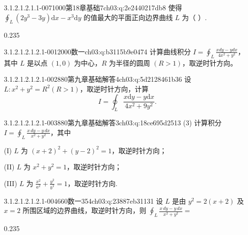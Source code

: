 \begin{q}{3.1.2.1.2.1.1-007}{1000第18章基础7}{ch03:q:2e2440217db8}
使得 $\displaystyle \oint_L (2y^3-3y)\mathrm{d}x - x^3\mathrm{d}y$ 的值最大的平面正向边界曲线 $L$ 为（ ）.
\begin{opts}{0.235}
\hfill{}\hfill{}\hfill{}
\end{opts}
\end{q}

\par\addvspace{2.4ex}\noindent
\begin{minipage}{\linewidth}


\begin{q}{3.1.2.1.2.1.2.1-001}{2000数一}{ch03:q:b3115b9e0474}
计算曲线积分 $\displaystyle I=\oint_L \frac{xdy - ydx}{4x^2+y^2}$，其中 $L$ 是以点 $(1,0)$ 为中心，$R$ 为半径的圆周 $(R>1)$，取逆时针方向。
\end{q}
\end{minipage}


\begin{q}{3.1.2.1.2.1.2.1-002}{880第九章基础解答4}{ch03:q:5d2128461b36}
设 $L:x^2+y^2=R^2(R>1)$，取逆时针方向，计算
\[
I=\oint_L \frac{x\mathrm{d}y-y\mathrm{d}x}{4x^2+9y^2}.
\]
\end{q}

\begin{q}{3.1.2.1.2.1.2.1-003}{880第九章基础解答3}{ch03:q:18ce695d2513}
(3) 计算积分 $\displaystyle I=\oint_{L}\frac{x\,dy-y\,dx}{x^2+y^2}$，其中

(I) $L$ 为 $(x+2)^2+(y-2)^2=1$，取逆时针方向；

(II) $L$ 为 $x^2+y^2=1$，取逆时针方向；

(III) $L$ 为 $\frac{x^2}{a^2}+\frac{y^2}{b^2}=1$，取逆时针方向.
\end{q}

\begin{q}{3.1.2.1.2.1.2.1-004}{660数一354}{ch03:q:23887eb31131}
设 $L$ 是由 $y^2=2(x+2)$ 及 $x=2$ 所围区域的边界曲线，取逆时针方向，则
$\displaystyle \oint_L \frac{x\,dy-y\,dx}{x^2+y^2}=$
\begin{opts}{0.235}
\hfill{}\hfill{}\hfill{}
\end{opts}
\end{q}

